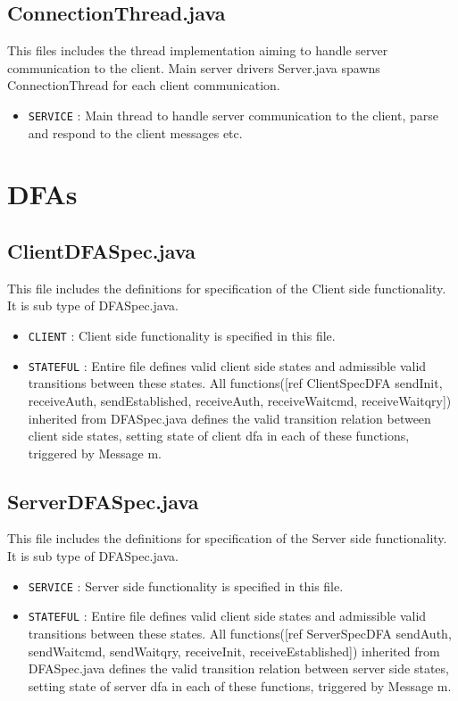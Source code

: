\documentclass[12pt]{usenixsubmit}
\begin{document}
\subsection{ConnectionThread.java} This files includes the thread implementation aiming to handle server communication to the client. Main server drivers Server.java spawns ConnectionThread for each client communication.
\begin{itemize}
 \item {\tt SERVICE} : Main thread to handle server communication to the client, parse and respond to the client messages etc.
\end{itemize}
  
\section{DFAs}
\subsection{ClientDFASpec.java}This file includes the definitions for specification of the Client side functionality. It is sub type of DFASpec.java.
\begin{itemize}
\item  {\tt CLIENT} : Client side functionality is specified in this file.
\item {\tt STATEFUL} : Entire file defines valid client side states and admissible valid transitions between these states. All functions([ref ClientSpecDFA \textsf{sendInit}, receiveAuth, sendEstablished, receiveAuth, receiveWaitcmd, receiveWaitqry]) inherited from DFASpec.java defines the valid transition relation between client side states, setting state of client dfa in each of these functions, triggered by \textsf{Message m}. 
  \end{itemize}
\subsection{ServerDFASpec.java}This file includes the definitions for specification of the Server side functionality. It is sub type of DFASpec.java.
\begin{itemize}
  \item {\tt SERVICE} : Server side functionality is specified in this file.
  \item {\tt STATEFUL} : Entire file defines valid client side states and admissible valid transitions between these states. All functions([ref ServerSpecDFA sendAuth, sendWaitcmd, sendWaitqry, receiveInit, receiveEstablished]) inherited from DFASpec.java defines the valid transition relation between server side states, setting state of server dfa in each of these functions, triggered by \textsf{Message m}. 
  \end{itemize}
\end{document}

